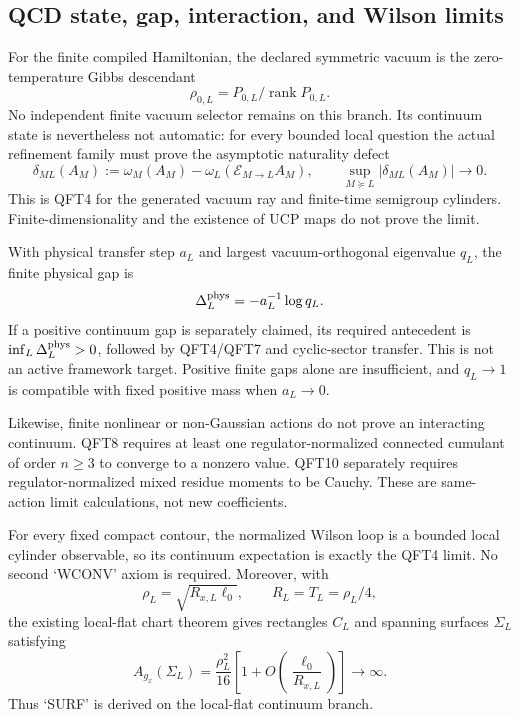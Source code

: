 \documentclass[12pt,a4paper]{article}
\begin{document}
\subsection{QCD state, gap, interaction, and Wilson limits}
\label{p12:sec:v164-qcd-state-gap-wilson}

\begin{theorem}
\label{p12:thm:v164-finite-vacuum-continuum-state}
For the finite compiled Hamiltonian, the declared symmetric vacuum is the
zero-temperature Gibbs descendant
\[
 \rho_{0,L}=P_{0,L}/\operatorname{rank}P_{0,L}.
\]
No independent finite vacuum selector remains on this branch.  Its continuum
state is nevertheless not automatic: for every bounded local question the
actual refinement family must prove the asymptotic naturality defect
\[
 \delta_{ML}(A_M)
 :=\omega_M(A_M)-\omega_L(\mathcal E_{M\to L}A_M),
 \qquad
 \sup_{M\succeq L}|\delta_{ML}(A_M)|\longrightarrow0.
\]
This is QFT4 for the generated vacuum ray and finite-time semigroup cylinders.
Finite-dimensionality and the existence of UCP maps do not prove the limit.
\end{theorem}

\begin{theorem}
\label{p12:thm:v164-physical-gap-interaction-witness}
With physical transfer step \(a_L\) and largest vacuum-orthogonal eigenvalue
\(q_L\), the finite physical gap is
\[
 \Delta_L^{\rm phys}=-a_L^{-1}\log q_L.
\]
If a positive continuum gap is separately claimed, its required antecedent is
\(\inf_L\Delta_L^{\rm phys}>0\), followed by QFT4/QFT7 and cyclic-sector
transfer.  This is not an active framework target.  Positive finite gaps alone are insufficient, and
\(q_L\to1\) is compatible with fixed positive mass when \(a_L\to0\).

Likewise, finite nonlinear or non-Gaussian actions do not prove an interacting
continuum.  QFT8 requires at least one regulator-normalized connected
cumulant of order \(n\ge3\) to converge to a nonzero value.  QFT10 separately
requires regulator-normalized mixed residue moments to be Cauchy.  These are
same-action limit calculations, not new coefficients.
\end{theorem}

\begin{theorem}
\label{p12:thm:v164-fixed-wilson-surface-exhaustion}
For every fixed compact contour, the normalized Wilson loop is a bounded
local cylinder observable, so its continuum expectation is exactly the QFT4
limit.  No second `WCONV' axiom is required.  Moreover, with
\[
 \rho_L=\sqrt{R_{x,L}\ell_0},
 \qquad R_L=T_L=\rho_L/4,
\]
the existing local-flat chart theorem gives rectangles \(C_L\) and spanning
surfaces \(\Sigma_L\) satisfying
\[
 A_{g_x}(\Sigma_L)
 =\frac{\rho_L^2}{16}
 \left[1+O\!\left(\frac{\ell_0}{R_{x,L}}\right)\right]
 \longrightarrow\infty.
\]
Thus `SURF' is derived on the local-flat continuum branch.
\end{theorem}
\end{document}
